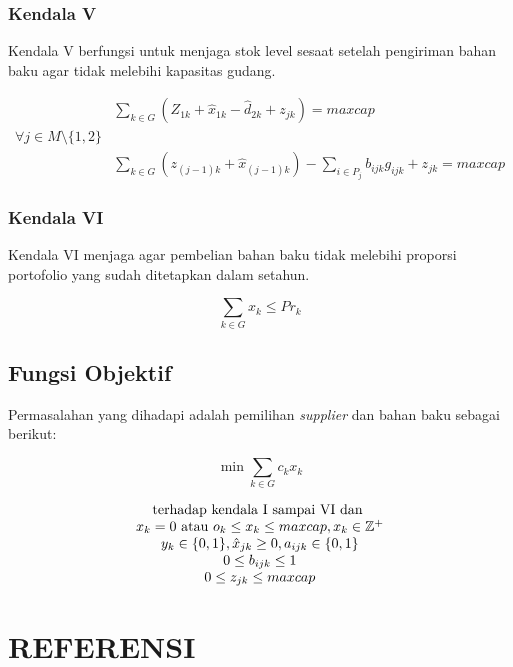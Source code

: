 \documentclass[
  12pt,
]{article}
\begin{document}
\hypertarget{kendala-v}{%
\subsubsection*{Kendala V}\label{kendala-v}}

Kendala V berfungsi untuk menjaga stok level sesaat setelah pengiriman
bahan baku agar tidak melebihi kapasitas gudang.

\[\begin{matrix}
 & \sum_{k \in G} (Z_{1k} + \hat{x}_{1k} - \hat{d}_{2k} + z_{jk}) = maxcap \\
\forall j \in M \setminus \{ 1,2 \} & \\
 & \sum_{k \in G} (z_{(j-1)k} + \hat{x}_{(j-1)k}) - \sum_{i \in P_j} b_{ijk} g_{ijk} + z_{jk} = maxcap
\end{matrix}\]

\hypertarget{kendala-vi}{%
\subsubsection*{Kendala VI}\label{kendala-vi}}

Kendala VI menjaga agar pembelian bahan baku tidak melebihi proporsi
portofolio yang sudah ditetapkan dalam setahun.

\[\sum_{k \in G} x_k \leq Pr_k\]

\hypertarget{fungsi-objektif}{%
\subsection{Fungsi Objektif}\label{fungsi-objektif}}

Permasalahan yang dihadapi adalah pemilihan \emph{supplier} dan bahan
baku sebagai berikut:

\[\min \sum_{k \in G} c_k x_k\]

\[\begin{matrix}
\text{terhadap kendala I sampai VI dan } \\
x_k = 0 \text{ atau } o_k \leq x_k \leq maxcap, \space x_k \in \mathbb{Z}^+ \\
y_k \in \{ 0,1 \}, \hat{x}_{jk} \geq 0, a_{ijk} \in \{ 0,1 \} \\
0 \leq b_{ijk} \leq 1 \\
0 \leq z_{jk} \leq maxcap \\
\end{matrix}\]

\newpage

\hypertarget{referensi}{%
\section*{REFERENSI}\label{referensi}}
\end{document}
